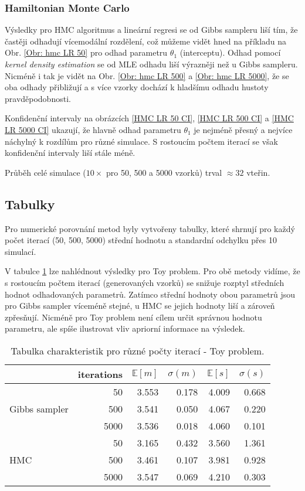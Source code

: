\documentclass[11pt,oneside,american,czech]{article}
\newcommand{\E}{\mathbb{E}}
\begin{document}
\subsubsection{Hamiltonian Monte Carlo}

Výsledky pro HMC algoritmus a lineární regresi se od Gibbs sampleru liší tím, že častěji odhadují vícemodální rozdělení, což můžeme vidět hned na příkladu na Obr. \ref{Obr: hmc LR 50} pro odhad parametru $\theta_1$ (interceptu). Odhad pomocí \textit{kernel density estimation} se od MLE odhadu liší výrazněji než u Gibbs sampleru. Nicméně i tak je vidět na Obr. \ref{Obr: hmc LR 500} a \ref{Obr: hmc LR 5000}, že se oba odhady přibližují a s více vzorky dochází k hladšímu odhadu hustoty pravděpodobnosti.

Konfidenční intervaly na obrázcích \ref{HMC LR 50 CI}, \ref{HMC LR 500 CI} a \ref{HMC LR 5000 CI} ukazují, že hlavně odhad parametru $\theta_1$ je nejméně přesný a nejvíce náchylný k rozdílům pro různé simulace. S rostoucím počtem iterací se však konfidenční intervaly liší stále méně.

Průběh celé simulace ($10\times$ pro 50, 500 a 5000 vzorků) trval $\approx 32$ vteřin.

\subsection{Tabulky}

Pro numerické porovnání metod byly vytvořeny tabulky, které shrnují pro každý počet iterací (50, 500, 5000) střední hodnotu a standardní odchylku přes 10 simulací.

V tabulce \ref{Tab: Toy} lze nahlédnout výsledky pro Toy problem. Pro obě metody vidíme, že s rostoucím počtem iterací (generovaných vzorků) se snižuje rozptyl středních hodnot odhadovaných parametrů. Zatímco střední hodnoty obou parametrů jsou pro Gibbs sampler víceméně stejné, u HMC se jejich hodnoty liší a zároveň zpřesňují. Nicméně pro Toy problem není cílem určit správnou hodnotu parametru, ale spíše ilustrovat vliv apriorní informace na výsledek.

\begin{table}[]
	\centering
	\begin{tabular}{lrrrrr}
		\toprule
		& \multicolumn{1}{c}{iterations} & \multicolumn{1}{c}{$\E[m]$} & \multicolumn{1}{c}{$\sigma(m)$} & \multicolumn{1}{c}{$\E[s]$} & \multicolumn{1}{c}{$\sigma(s)$} \\ \toprule
		\multirow{3}{*}{Gibbs sampler} & 50 & 3.553 & 0.178 & 4.009 & 0.668 \\
		& 500 & 3.541 & 0.050 & 4.067 & 0.220 \\
		& 5000 & 3.536 & 0.018 & 4.060 & 0.101 \\ \midrule
		\multirow{3}{*}{HMC} & 50 & 3.165 & 0.432 & 3.560 & 1.361 \\
		& 500 & 3.461 & 0.107 & 3.981 & 0.928 \\
		& 5000 & 3.547 & 0.069 & 4.210 & 0.303 \\ \bottomrule
	\end{tabular}
	\caption{Tabulka charakteristik pro různé počty iterací - Toy problem.}
	\label{Tab: Toy}
\end{table}
\end{document}
